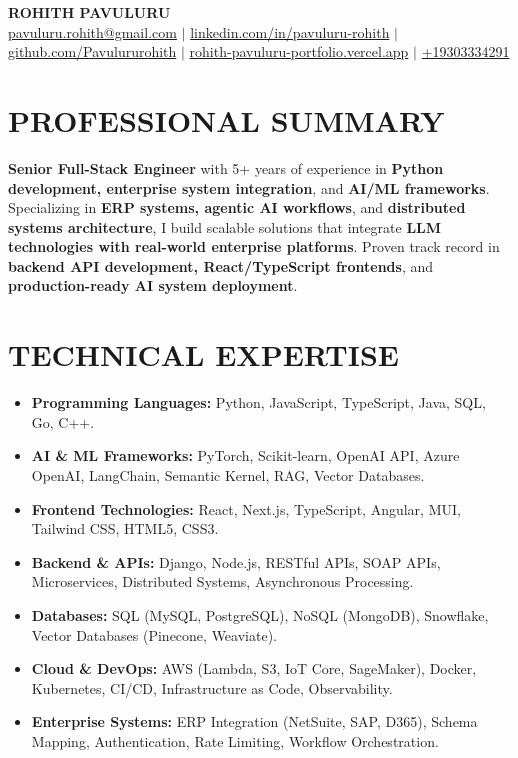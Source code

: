 \documentclass[letterpaper,20pt]{article}
\newcommand{\resumeItem}[2]{
  \item\small{
    \textbf{}{#2 \vspace{-2pt}}
  }
}
\newcommand{\resumeSubItem}[2]{\resumeItem{#1}{#2}\vspace{-3pt}}
\newcommand{\resumeSubHeadingListStart}{\begin{itemize}[leftmargin=*]}
\newcommand{\resumeSubHeadingListEnd}{\end{itemize}}
\begin{document}
\begin{center}
    \textbf{\Large ROHITH PAVULURU} \\ \vspace{2pt}
    \small
    \href{mailto:pavuluru.rohith@gmail.com}{pavuluru.rohith@gmail.com} $|$ 
    \href{https://linkedin.com/in/pavuluru-rohith}{linkedin.com/in/pavuluru-rohith} $|$
    \href{https://github.com/Pavulururohith}{github.com/Pavulururohith} $|$
    \href{https://rohith-pavuluru-portfolio.vercel.app}{rohith-pavuluru-portfolio.vercel.app} $|$ 
    \href{tel:+19303334291}{+19303334291}
\end{center}
\vspace{-10pt}

\section{PROFESSIONAL SUMMARY}
    \small{\textbf{Senior Full-Stack Engineer} with 5+ years of experience in \textbf{Python development, enterprise system integration}, and \textbf{AI/ML frameworks}. Specializing in \textbf{ERP systems, agentic AI workflows}, and \textbf{distributed systems architecture}, I build scalable solutions that integrate \textbf{LLM technologies with real-world enterprise platforms}. Proven track record in \textbf{backend API development, React/TypeScript frontends}, and \textbf{production-ready AI system deployment}.}
\vspace{-2pt}

\section{TECHNICAL EXPERTISE}
\resumeSubHeadingListStart
\resumeSubItem{}{\small\textbf{Programming Languages:} Python, JavaScript, TypeScript, Java, SQL, Go, C++.}
\resumeSubItem{}{\small\textbf{AI \& ML Frameworks:} PyTorch, Scikit-learn, OpenAI API, Azure OpenAI, LangChain, Semantic Kernel, RAG, Vector Databases.}
\resumeSubItem{}{\small\textbf{Frontend Technologies:} React, Next.js, TypeScript, Angular, MUI, Tailwind CSS, HTML5, CSS3.}
\resumeSubItem{}{\small\textbf{Backend \& APIs:} Django, Node.js, RESTful APIs, SOAP APIs, Microservices, Distributed Systems, Asynchronous Processing.}
\resumeSubItem{}{\small\textbf{Databases:} SQL (MySQL, PostgreSQL), NoSQL (MongoDB), Snowflake, Vector Databases (Pinecone, Weaviate).}
\resumeSubItem{}{\small\textbf{Cloud \& DevOps:} AWS (Lambda, S3, IoT Core, SageMaker), Docker, Kubernetes, CI/CD, Infrastructure as Code, Observability.}
\resumeSubItem{}{\small\textbf{Enterprise Systems:} ERP Integration (NetSuite, SAP, D365), Schema Mapping, Authentication, Rate Limiting, Workflow Orchestration.}
\resumeSubHeadingListEnd
\vspace{-3pt}
\end{document}
